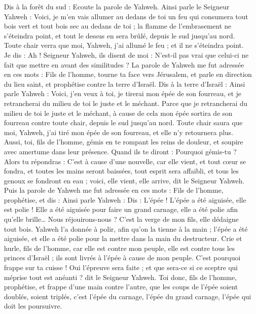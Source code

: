 \begin{multicols}{2}
Dis à la forêt du sud : Ecoute la parole de Yahweh. Ainsi parle le Seigneur Yahweh : Voici, je m'en vais allumer au dedans de toi un feu qui consumera tout bois vert et tout bois sec au dedans de toi ; la flamme de l'embrasement ne s'éteindra point, et tout le dessus en sera brûlé, depuis le sud jusqu'au nord.
Toute chair verra que moi, Yahweh, j'ai allumé le feu ; et il ne s'éteindra point.
Je dis : Ah ! Seigneur Yahweh, ils disent de moi : N'est-il pas vrai que celui-ci ne fait que mettre en avant des similitudes ?
La parole de Yahweh me fut adressée en ces mots :
Fils de l'homme, tourne ta face vers Jérusalem, et parle en direction du lieu saint, et prophétise contre la terre d'Israël.
Dis à la terre d'Israël : Ainsi parle Yahweh : Voici, j'en veux à toi, je tirerai mon épée de son fourreau, et je retrancherai du milieu de toi le juste et le méchant.
Parce que je retrancherai du milieu de toi le juste et le méchant, à cause de cela mon épée sortira de son fourreau contre toute chair, depuis le sud jusqu'au nord.
Toute chair saura que moi, Yahweh, j'ai tiré mon épée de son fourreau, et elle n'y retournera plus.
Aussi, toi, fils de l'homme, gémis en te rompant les reins de douleur, et soupire avec amertume dans leur présence.
Quand ils te diront : Pourquoi gémis-tu ? Alors tu répondras : C'est à cause d'une nouvelle, car elle vient, et tout cœur se fondra, et toutes les mains seront baissées, tout esprit sera affaibli, et tous les genoux se fondront en eau ; voici, elle vient, elle arrive, dit le Seigneur Yahweh.
Puis la parole de Yahweh me fut adressée en ces mots :
Fils de l'homme, prophétise, et dis : Ainsi parle Yahweh : Dis : L'épée ! L'épée a été aiguisée, elle est polie !
Elle a été aiguisée pour faire un grand carnage, elle a été polie afin qu'elle brille… Nous réjouirons-nous ? C'est la verge de mon fils, elle dédaigne tout bois.
Yahweh l'a donnée à polir, afin qu'on la tienne à la main ; l'épée a été aiguisée, et elle a été polie pour la mettre dans la main du destructeur.
Crie et hurle, fils de l'homme, car elle est contre mon peuple, elle est contre tous les princes d'Israël ; ils sont livrés à l'épée à cause de mon peuple. C'est pourquoi frappe sur ta cuisse !
Oui l'épreuve sera faite ; et que sera-ce si ce sceptre qui méprise tout est anéanti ? dit le Seigneur Yahweh.
Toi donc, fils de l'homme, prophétise, et frappe d'une main contre l'autre, que les coups de l'épée soient doublés, soient triplés, c'est l'épée du carnage, l'épée du grand carnage, l'épée qui doit les poursuivre.

\end{multicols}
